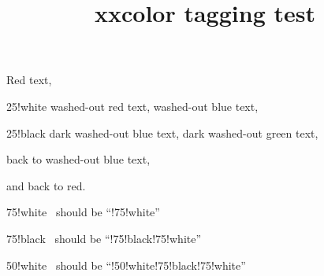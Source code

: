 \documentclass{article}
\title{xxcolor tagging test}
\begin{document}
\begin{minipage}{3.5cm}\raggedright
\color{red}Red text,
\begin{colormixin}{25!white}
washed-out red text,
\color{blue} washed-out blue text,
\begin{colormixin}{25!black}
dark washed-out blue text,
\color{green} dark washed-out green text,%
\end{colormixin}
back to washed-out blue text,%
\end{colormixin}
and back to red.
\end{minipage}%

\bigskip

\begin{minipage}{\linewidth-6pt}\raggedright
\begin{colormixin}{75!white}
\ should be ``!75!white''\par
\begin{colormixin}{75!black}
\ should be ``!75!black!75!white''\par
\begin{colormixin}{50!white}
\ should be ``!50!white!75!black!75!white''\par
\end{colormixin}
\end{colormixin}
\end{colormixin}
\end{minipage}
\end{document}
